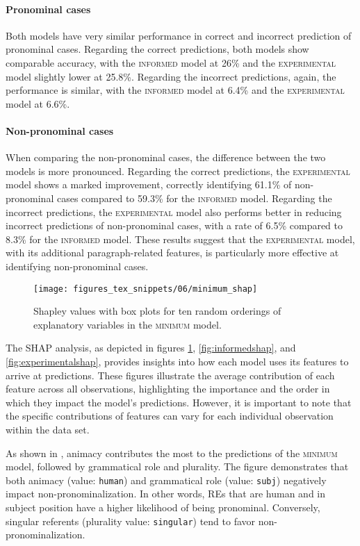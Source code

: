 \paragraph*{Pronominal cases} Both models have very similar performance in correct and incorrect prediction of pronominal cases. Regarding the correct predictions, both models show comparable accuracy, with the \textsc{informed} model at 26\% and the \textsc{experimental} model slightly lower at 25.8\%. Regarding the incorrect predictions, again, the performance is similar, with the \textsc{informed} model at 6.4\% and the \textsc{experimental} model at 6.6\%. 

\paragraph*{Non-pronominal cases} When comparing the non-pronominal cases, the difference between the two models is more pronounced. Regarding the correct predictions, the \textsc{experimental} model shows a marked improvement, correctly identifying 61.1\% of non-pronominal cases compared to 59.3\% for the \textsc{informed} model. Regarding the incorrect predictions, the \textsc{experimental} model also performs better in reducing incorrect predictions of non-pronominal cases, with a rate of 6.5\% compared to 8.3\% for the \textsc{informed} model. 
These results suggest that the \textsc{experimental} model, with its additional paragraph-related features, is particularly more effective at identifying non-pronominal cases. 

\begin{figure}
	\centering
	\texttt{[image: figures\_tex\_snippets/06/minimum\_shap]}
	\caption[Shapley values of the \textsc{minimum} model.]{Shapley values with box plots for ten random orderings of explanatory variables in the \textsc{minimum} model.}
	\label{fig:minimumshap}
\end{figure}

The SHAP analysis, as depicted in figures \ref{fig:minimumshap}, \ref{fig:informedshap}, and \ref{fig:experimentalshap}, provides insights into how each model uses its features to arrive at predictions. These figures illustrate the average contribution of each feature across all observations, highlighting the importance and the order in which they impact the model's predictions. However, it is important to note that the specific contributions of features can vary for each individual observation within the data set.

As shown in , animacy contributes the most to the predictions of the \textsc{minimum} model, followed by grammatical role and plurality. The figure demonstrates that both animacy (value: \texttt{human}) and grammatical role (value: \texttt{subj}) negatively impact non-pronominalization. In other words, REs that are human and in subject position have a higher likelihood of being pronominal. Conversely, singular referents (plurality value: \texttt{singular}) tend to favor non-pronominalization.


